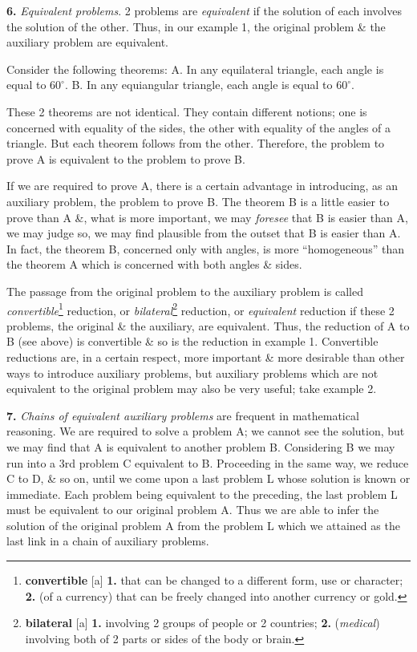 \documentclass[oneside]{book}
\numberwithin{equation}{section}
\begin{document}
\textbf{6.} \textit{Equivalent problems}. 2 problems are \textit{equivalent} if the solution of each involves the solution of the other. Thus, in our example 1, the original problem \& the auxiliary problem are equivalent.

Consider the following theorems: A. In any equilateral triangle, each angle is equal to $60^\circ$. B. In any equiangular triangle, each angle is equal to $60^\circ$.

These 2 theorems are not identical. They contain different notions; one is concerned with equality of the sides, the other with equality of the angles of a triangle. But each theorem follows from the other. Therefore, the problem to prove A is equivalent to the problem to prove B.

If we are required to prove A, there is a certain advantage in introducing, as an auxiliary problem, the problem to prove B. The theorem B is a little easier to prove than A \&, what is more important, we may \textit{foresee} that B is easier than A, we may judge so, we may find plausible from the outset that B is easier than A. In fact, the theorem B, concerned only with angles, is more ``homogeneous'' than the theorem A which is concerned with both angles \& sides.

The passage from the original problem to the auxiliary problem is called \textit{convertible}\footnote{\textbf{convertible} [a] \textbf{1.} that can be changed to a different form, use or character; \textbf{2.} (of a currency) that can be freely changed into another currency or gold.} reduction, or \textit{bilateral}\footnote{\textbf{bilateral} [a] \textbf{1.} involving 2 groups of people or 2 countries; \textbf{2.} (\textit{medical}) involving both of 2 parts or sides of the body or brain.} reduction, or \textit{equivalent} reduction if these 2 problems, the original \& the auxiliary, are equivalent. Thus, the reduction of A to B (see above) is convertible \& so is the reduction in example 1. Convertible reductions are, in a certain respect, more important \& more desirable than other ways to introduce auxiliary problems, but auxiliary problems which are not equivalent to the original problem may also be very useful; take example 2.

\textbf{7.} \textit{Chains of equivalent auxiliary problems} are frequent in mathematical reasoning. We are required to solve a problem A; we cannot see the solution, but we may find that A is equivalent to another problem B. Considering B we may run into a 3rd problem C equivalent to B. Proceeding in the same way, we reduce C to D, \& so on, until we come upon a last problem L whose solution is known or immediate. Each problem being equivalent to the preceding, the last problem L must be equivalent to our original problem A. Thus we are able to infer the solution of the original problem A from the problem L which we attained as the last link in a chain of auxiliary problems.
\end{document}
